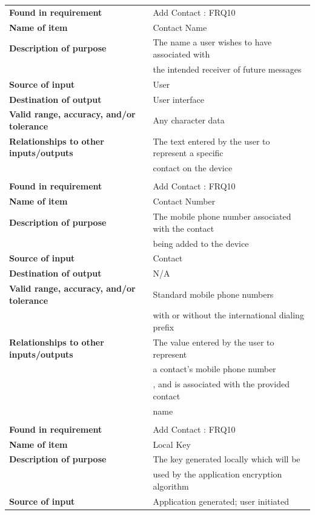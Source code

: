 \begin{tabular}{ll}
\textbf{Found in requirement}&Add Contact : FRQ10\\
\textbf{Name of item}&Contact Name\\
\textbf{Description of purpose}&The name a user wishes to have associated with\\& the intended receiver of future messages\\
\textbf{Source of input}&User\\
\textbf{Destination of output}&User interface\\
\textbf{Valid range, accuracy, and/or tolerance}&Any character data\\
\textbf{Relationships to other inputs/outputs}&The text entered by the user to represent a specific\\& contact on the device\\
&\\
\textbf{Found in requirement}&Add Contact : FRQ10\\
\textbf{Name of item}&Contact Number\\
\textbf{Description of purpose}&The mobile phone number associated with the contact\\& being added to the device\\
\textbf{Source of input}&Contact\\
\textbf{Destination of output}&N/A\\
\textbf{Valid range, accuracy, and/or tolerance}&Standard mobile phone numbers\\&with or without the international dialing prefix\\
\textbf{Relationships to other inputs/outputs}&The value entered by the user to represent\\& a contact's mobile phone number\\& , and is associated with the provided contact\\& name\\
&\\
\textbf{Found in requirement}&Add Contact : FRQ10\\
\textbf{Name of item}&Local Key\\
\textbf{Description of purpose}&The key generated locally which will be\\& used by the application encryption algorithm\\
\textbf{Source of input}&Application generated; user initiated\\

\end{tabular}
